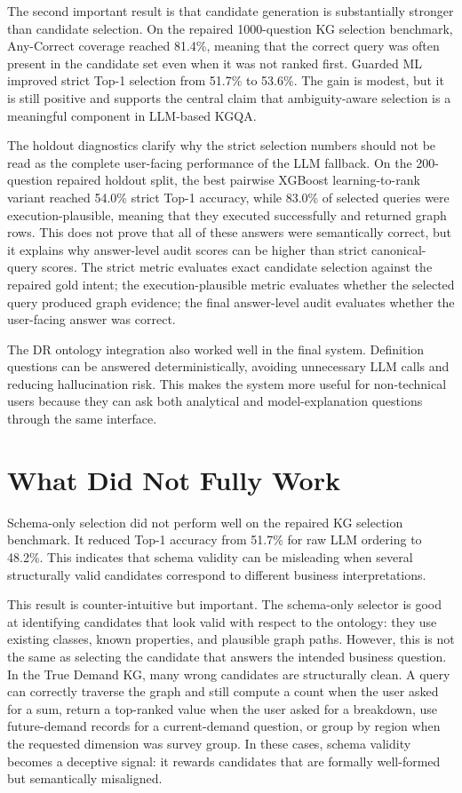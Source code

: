 \documentclass[
  12pt,
  english,
  oneside]{report}
\begin{document}
The second important result is that candidate generation is substantially stronger than candidate selection. On the repaired 1000-question KG selection benchmark, Any-Correct coverage reached 81.4\%, meaning that the correct query was often present in the candidate set even when it was not ranked first. Guarded ML improved strict Top-1 selection from 51.7\% to 53.6\%. The gain is modest, but it is still positive and supports the central claim that ambiguity-aware selection is a meaningful component in LLM-based KGQA.

The holdout diagnostics clarify why the strict selection numbers should not be read as the complete user-facing performance of the LLM fallback. On the 200-question repaired holdout split, the best pairwise XGBoost learning-to-rank variant reached 54.0\% strict Top-1 accuracy, while 83.0\% of selected queries were execution-plausible, meaning that they executed successfully and returned graph rows. This does not prove that all of these answers were semantically correct, but it explains why answer-level audit scores can be higher than strict canonical-query scores. The strict metric evaluates exact candidate selection against the repaired gold intent; the execution-plausible metric evaluates whether the selected query produced graph evidence; the final answer-level audit evaluates whether the user-facing answer was correct.

The DR ontology integration also worked well in the final system. Definition questions can be answered deterministically, avoiding unnecessary LLM calls and reducing hallucination risk. This makes the system more useful for non-technical users because they can ask both analytical and model-explanation questions through the same interface.

\section{What Did Not Fully Work}
\label{sec:what-did-not-work}

Schema-only selection did not perform well on the repaired KG selection benchmark. It reduced Top-1 accuracy from 51.7\% for raw LLM ordering to 48.2\%. This indicates that schema validity can be misleading when several structurally valid candidates correspond to different business interpretations.

This result is counter-intuitive but important. The schema-only selector is good at identifying candidates that look valid with respect to the ontology: they use existing classes, known properties, and plausible graph paths. However, this is not the same as selecting the candidate that answers the intended business question. In the True Demand KG, many wrong candidates are structurally clean. A query can correctly traverse the graph and still compute a count when the user asked for a sum, return a top-ranked value when the user asked for a breakdown, use future-demand records for a current-demand question, or group by region when the requested dimension was survey group. In these cases, schema validity becomes a deceptive signal: it rewards candidates that are formally well-formed but semantically misaligned.
\end{document}
